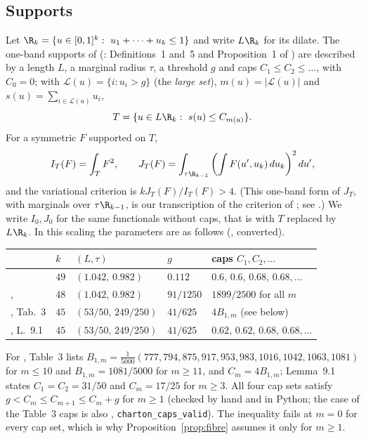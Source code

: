 \subsection*{Supports}
Let
$\R_k=\{u\in[0,1]^k:\ u_1+\dots+u_k\le1\}$ and write $L\R_k$ for its dilate.
The one-band supports of \cite{Sta26} (: Definitions~1
and~5 and Proposition~1 of \cite{Sta26}) are described by a length $L$, a marginal radius
$\tau$, a threshold $g$ and caps $C_1\le C_2\le\dots$, with $C_0=0$; with
$\mathcal L(u)=\{i:u_i>g\}$ (the \emph{large set}), $m(u)=|\mathcal L(u)|$ and
$s(u)=\sum_{i\in\mathcal L(u)}u_i$,
\[
T=\{u\in L\R_k:\ s(u)\le C_{m(u)}\}.
\]
For a symmetric $F$ supported on $T$,
\[
I_T(F)=\int_TF^2,\qquad
J_T(F)=\int_{\tau\R_{k-1}}\left(\int F(u',u_k)\,du_k\right)^2du',
\]
and the variational criterion is $kJ_T(F)/I_T(F)>4$. (This one-band form of
$J_T$, with marginals over $\tau\R_{k-1}$, is our transcription of the
criterion of \cite[Prop.~1]{Sta26}; see \cite[\S5]{Kim26}.) We write
$I_0,J_0$ for the same functionals without caps, that is with $T$ replaced by
$L\R_k$. In this scaling the parameters are as follows (,
converted).
\begin{center}\small
\begin{tabular}{@{}lllll@{}}
\toprule
 & $k$ & $(L,\tau)$ & $g$ & caps $C_1,C_2,\dots$\\
\midrule
\cite{Sta26} & $49$ & $(1.042,\,0.982)$ & $0.112$ & $0.6,\,0.6,\,0.68,\,0.68,\dots$\\
\cite{Kin26}, \cite{SY26} & $48$ & $(1.042,\,0.982)$ & $91/1250$ & $1899/2500$ for all $m$\\
\cite{Cha26}, Tab.~3 & $45$ & $(53/50,\,249/250)$ & $41/625$ & $4B_{1,m}$ (see below)\\
\cite{Cha26}, L.~9.1 & $45$ & $(53/50,\,249/250)$ & $41/625$ & $0.62,\,0.62,\,0.68,\,0.68,\dots$\\
\bottomrule
\end{tabular}
\end{center}
For \cite{Cha26}, Table~3 lists
$B_{1,m}=\frac1{5000}(777,794,875,917,953,983,1016,1042,1063,1081)$ for
$m\le10$ and $B_{1,m}=1081/5000$ for $m\ge11$, and $C_m=4B_{1,m}$; Lemma~9.1
states $C_1=C_2=31/50$ and $C_m=17/25$ for $m\ge3$. All four cap sets satisfy
$g<C_m\le C_{m+1}\le C_m+g$ for $m\ge1$ (checked by hand and in Python; the
case of the Table~3 caps is also , \texttt{charton\_caps\_valid}).
The inequality fails at $m=0$ for every cap set, which is why
Proposition~\ref{prop:fibre} assumes it only for $m\ge1$.

